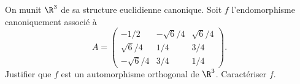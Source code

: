 \begin{enonce}
\begin{exercise}[ID={RMS123 E983, Mines Nancy PSI},subtitle={},tags={}]
On munit $\R^3$ de sa structure euclidienne canonique.
Soit $f$ l'endomorphisme canoniquement associé à 
\begin{equation*}
  A=
  \begin{pmatrix}
  -1/2 & -\sqrt6/4 & \sqrt6/4\\
  \sqrt6/4 & 1/4 & 3/4\\
  -\sqrt6/4 & 3/4 & 1/4
  \end{pmatrix}.
\end{equation*}
Justifier que $f$ est un automorphisme orthogonal de $\R^3$. Caractériser $f$.
\end{exercise}
\begin{solution}
\end{solution}
\end{enonce}
